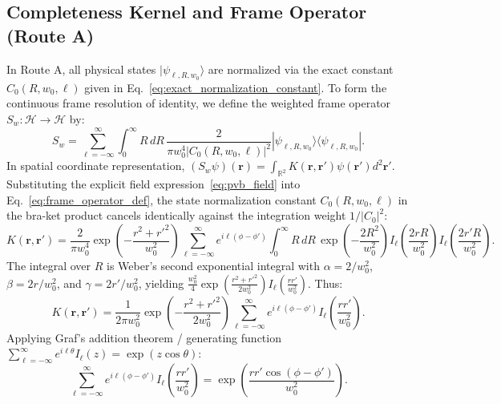 \documentclass[11pt,a4paper]{article}
\begin{document}
\subsection{Completeness Kernel and Frame Operator (Route A)}

In Route A, all physical states $|\psi_{\ell, R, w_0}\rangle$ are normalized via the exact constant $C_0(R, w_0, \ell)$ given in Eq.~\eqref{eq:exact_normalization_constant}. To form the continuous frame resolution of identity, we define the weighted frame operator $S_w: \mathcal{H} \to \mathcal{H}$ by:
\begin{equation}
S_w = \sum_{\ell=-\infty}^\infty \int_0^\infty R \, dR \, \frac{2}{\pi w_0^4 |C_0(R, w_0, \ell)|^2} |\psi_{\ell, R, w_0}\rangle \langle \psi_{\ell, R, w_0}|.
\label{eq:frame_operator_def}
\end{equation}
In spatial coordinate representation, $(S_w \psi)(\mathbf{r}) = \int_{\mathbb{R}^2} K(\mathbf{r}, \mathbf{r}') \psi(\mathbf{r}') d^2\mathbf{r}'$. Substituting the explicit field expression~\eqref{eq:pvb_field} into Eq.~\eqref{eq:frame_operator_def}, the state normalization constant $C_0(R, w_0, \ell)$ in the bra-ket product cancels identically against the integration weight $1/|C_0|^2$:
\begin{equation}
K(\mathbf{r}, \mathbf{r}') = \frac{2}{\pi w_0^4} \exp\left( - \frac{r^2 + r'^2}{w_0^2} \right) \sum_{\ell=-\infty}^\infty e^{i \ell(\phi - \phi')} \int_0^\infty R \, dR \, \exp\left( - \frac{2 R^2}{w_0^2} \right) I_\ell\left( \frac{2 r R}{w_0^2} \right) I_\ell\left( \frac{2 r' R}{w_0^2} \right).
\label{eq:kernel_integral_setup}
\end{equation}
The integral over $R$ is Weber's second exponential integral with $\alpha = 2/w_0^2$, $\beta = 2r/w_0^2$, and $\gamma = 2r'/w_0^2$, yielding $\frac{w_0^2}{4} \exp(\frac{r^2 + r'^2}{2w_0^2}) I_\ell(\frac{r r'}{w_0^2})$. Thus:
\begin{equation}
K(\mathbf{r}, \mathbf{r}') = \frac{1}{2\pi w_0^2} \exp\left( - \frac{r^2 + r'^2}{2 w_0^2} \right) \sum_{\ell=-\infty}^\infty e^{i \ell(\phi - \phi')} I_\ell\left( \frac{r r'}{w_0^2} \right).
\label{eq:kernel_after_weber}
\end{equation}
Applying Graf's addition theorem / generating function $\sum_{\ell=-\infty}^\infty e^{i \ell \theta} I_\ell(z) = \exp(z \cos \theta)$:
\begin{equation}
\sum_{\ell=-\infty}^\infty e^{i \ell(\phi - \phi')} I_\ell\left( \frac{r r'}{w_0^2} \right) = \exp\left( \frac{r r' \cos(\phi - \phi')}{w_0^2} \right).
\label{eq:graf_application}
\end{equation}
\end{document}
